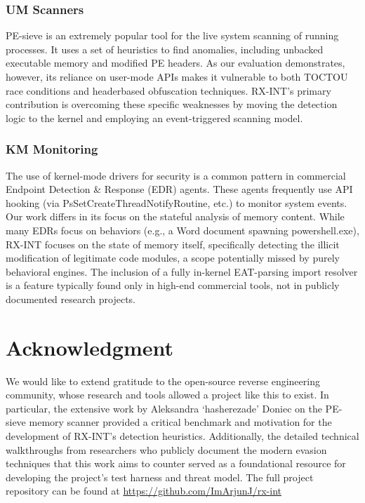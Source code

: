\documentclass[journal]{IEEEtran}
\begin{document}
\subsubsection{UM Scanners}
PE-sieve \cite{hasherezade_pesieve} is an extremely popular tool for the live system scanning of running processes. It uses a set of heuristics to find anomalies, including unbacked executable memory and modified PE headers. As our evaluation demonstrates, however, its reliance on user-mode APIs makes it vulnerable to both TOCTOU race conditions and headerbased obfuscation techniques. RX-INT's primary contribution is overcoming these specific weaknesses by moving the detection logic to the kernel and employing an event-triggered scanning model.

\subsubsection{KM Monitoring}
The use of kernel-mode drivers for security is a common pattern in commercial Endpoint Detection \& Response (EDR) agents. These agents frequently use API hooking (via PsSetCreateThreadNotifyRoutine, etc.) to monitor system events. Our work differs in its focus on the stateful analysis of memory content. While many EDRs focus on behaviors (e.g., a Word document spawning powershell.exe), RX-INT focuses on the state of memory itself, specifically detecting the illicit modification of legitimate code modules, a scope potentially missed by purely behavioral engines. The inclusion of a fully in-kernel EAT-parsing import resolver is a feature typically found only in high-end commercial tools, not in publicly documented research projects.

\section*{Acknowledgment}
We would like to extend gratitude to the open-source reverse engineering community, whose research and tools allowed a project like this to exist. In particular, the extensive work by Aleksandra `hasherezade' Doniec on the PE-sieve memory scanner provided a critical benchmark and motivation for the development of RX-INT's detection heuristics. Additionally, the detailed technical walkthroughs from researchers who publicly document the modern evasion techniques that this work aims to counter served as a foundational resource for developing the project's test harness and threat model. The full project repository can be found at \url{https://github.com/ImArjunJ/rx-int}






\end{document}
